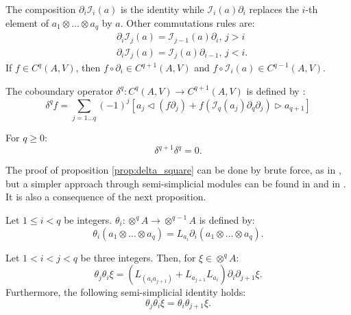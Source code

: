 The composition $\partial_i \mathcal{I}_i(a)$ is the identity while $\mathcal{I}_i(a) \partial_i$ replaces the $i$-th element of $a_1 \otimes \dots \otimes a_q$ by $a.$
Other commutations rules are:
\begin{equation}
    \label{eq:commutation_face_insertion}
    \begin{split}
    & \partial_i \mathcal{I}_j(a) = \mathcal{I}_{j-1}(a) \partial_i, \, j > i \\
    & \partial_i \mathcal{I}_j(a) = \mathcal{I}_j(a) \partial_{i-1}, \, j < i.
    \end{split}
\end{equation}
If $f \in C^q(A,V)$, then $f \circ \partial_i \in C^{q+1}(A,V)$ and $f \circ \mathcal{I}_i(a) \in C^{q-1}(A,V).$ 
\begin{defn}
    \label{def:kv_coboundary}
    The coboundary operator $\delta^q \colon C^q \left( A,V \right) \to C^{q+1}\left( A,V \right)$ is defined by \cite{Boyom2002}:
    \begin{equation}
        \label{eq:coboundary}
        \delta^q f = \sum_{j=1 \dots q} \left( -1 \right)^j \left[ a_j  \triangleleft \left(f \partial_j\right) +  f\left( \mathcal{I}_q(a_j)\partial_{q}\partial_j\right)\triangleright a_{q+1}  \right]
    \end{equation}
\end{defn}
\begin{prop}
    \label{prop:delta_square}
    For $q \geq 0:$
    \begin{equation}
    \label{eq:delta_square}
    \delta^{q+1} \delta^q = 0.
    \end{equation}
\end{prop}
The proof of proposition \ref{prop:delta_square} can be done by brute force, as in \cite{Boyom2002}, but a simpler approach through semi-simplicial modules can be found in
\cite{Boyom2016} and in \cite{Dzhumadil1999}. 
It is also a consequence of the next proposition.
\begin{defn}
\label{def:def_theta}
Let $1 \leq i < q$ be integers. $\theta_i \colon \otimes^q A \to \otimes^{q-1} A$ is defined by:
\begin{equation}
    \label{eq:def_theta}
    \theta_i \left( a_1 \otimes \dots \otimes a_q 
    \right) = L_{a_i} \partial_i \left( a_1 \otimes \dots \otimes a_q 
    \right). 
\end{equation}
\end{defn}
\begin{prop}
\label{prop:theta_simplicial}
Let $1 < i < j < q$ be three integers. Then, for $\xi \in \otimes^q A$:
\begin{equation}
\label{eq:theta_expression}
    \theta_j \theta_i \xi = \left(L_{(a_i a_{j+1})}  + L_{a_{j+1}}L_{a_i} \right) \partial_i \partial_{j+1} \xi.
\end{equation}
Furthermore, the following semi-simplicial identity holds:
\begin{equation}
    \label{eq:theta_simplicial}
    \theta_j \theta_i \xi = \theta_{i} \theta_{j+1} \xi.
\end{equation}
\end{prop}
